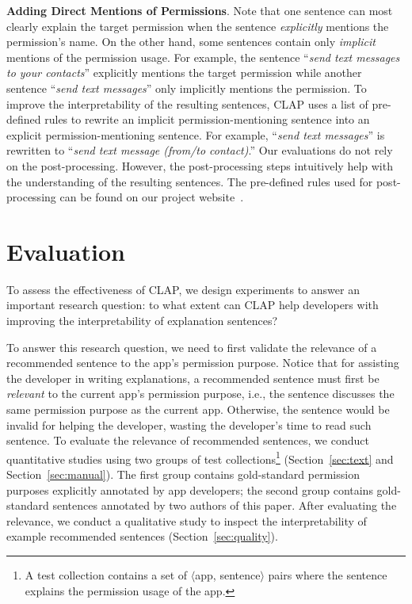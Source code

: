 \textbf{Adding Direct Mentions of Permissions}. Note that one sentence can most clearly explain the target permission when the sentence \emph{explicitly} mentions the permission's name. 
On the other hand, some sentences contain only \emph{implicit} mentions of the permission usage. 
For example, the sentence ``\emph{send text messages to your contacts}'' explicitly mentions the target permission  while another sentence ``\emph{send text messages}'' only implicitly mentions the permission. 
To improve the interpretability of the resulting sentences, CLAP uses a list of pre-defined rules to rewrite an implicit permission-mentioning sentence into an explicit permission-mentioning sentence. 
For example, ``\emph{send text messages}'' is rewritten to ``\emph{send text message (from/to contact)}.'' 
Our evaluations do not rely on the post-processing. 
However, the post-processing steps intuitively help with the understanding of the resulting sentences. 
The pre-defined rules used for post-processing can be found on our project website~\cite{clapproj}.
 



\section{Evaluation}
\label{sec:exp}

To assess the effectiveness of CLAP, we design experiments to answer an important research question: to what extent can CLAP help developers with improving the interpretability of explanation sentences?

To answer this research question, we need to first validate the relevance of a recommended sentence to the app's permission purpose.
Notice that for assisting the developer in writing explanations, a recommended sentence must first be \emph{relevant} to the current app's permission purpose, i.e., the sentence discusses the same permission purpose as the current app. Otherwise, the sentence would be invalid for helping the developer, wasting the developer's time to read such sentence. 
To evaluate the relevance of recommended sentences, we conduct quantitative studies using two groups of test collections\footnote{A test collection contains a set of $\langle$app, sentence$\rangle$ pairs where the sentence explains the permission usage of the app. } (Section~\ref{sec:text} and Section~\ref{sec:manual}). The first group contains gold-standard permission purposes explicitly annotated by app developers; the second group contains gold-standard sentences annotated by two authors of this paper. 
After evaluating the relevance, we conduct a qualitative study to inspect the interpretability of example recommended sentences (Section~\ref{sec:quality}).

